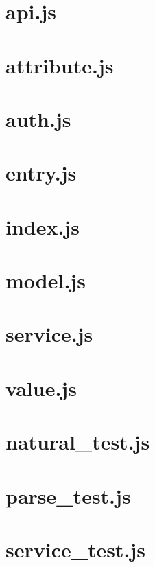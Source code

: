 \documentclass[a4paper,landscape]{report}
\begin{document}
\newpage
\section{api.js}


\newpage
\section{attribute.js}


\newpage
\section{auth.js}


\newpage
\section{entry.js}


\newpage
\section{index.js}


\newpage
\section{model.js}


\newpage
\section{service.js}


\newpage
\section{value.js}


\newpage
\section{natural\_test.js}


\newpage
\section{parse\_test.js}


\newpage
\section{service\_test.js}

\end{document}
